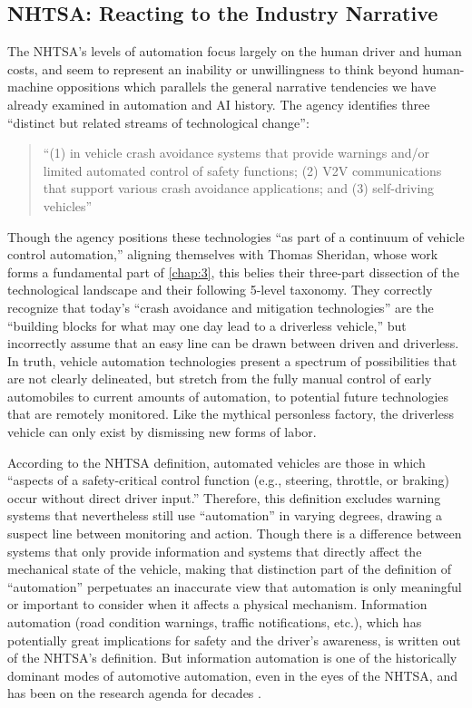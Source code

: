 \subsection{NHTSA: Reacting to the Industry Narrative}

The NHTSA's levels of automation focus largely on the human driver and
human costs, and seem to represent an inability or unwillingness to
think beyond human-machine oppositions which 
parallels the general narrative tendencies we have already examined in
automation and AI history. 
The agency identifies three ``distinct but related streams of
technological change'': 

\begin{quote}
``(1) in vehicle crash avoidance systems that provide warnings and/or
limited automated control of safety functions; (2) V2V communications
that support various crash avoidance applications; and (3)
self-driving vehicles''\cite[p. 3]{NHTSA}
\end{quote}

Though the agency positions these technologies ``as part of a
continuum of vehicle control automation,''\cite[p. 3]{NHTSA} aligning
themselves with Thomas Sheridan, whose
work forms a fundamental part of \ref{chap:3}, this belies
their three-part dissection of the technological landscape and their
following 5-level taxonomy. They correctly recognize that today's
``crash avoidance and mitigation technologies'' are the ``building blocks
for what may one day lead to a driverless vehicle,'' but incorrectly
assume that an easy line can be drawn between driven and
driverless.\cite[p. 3]{NHTSA} In truth, vehicle automation
technologies present a spectrum of possibilities that are not clearly
delineated, but stretch from the fully manual control of early
automobiles to current amounts of automation, to potential future
technologies that are remotely monitored. Like the mythical personless
factory, the driverless vehicle can only exist by dismissing new forms
of labor. 

According to the NHTSA definition, automated
vehicles are those in which ``aspects of a safety-critical control
function (e.g., steering, throttle, or braking) occur without direct
driver input.''\cite[p. 3]{NHTSA} Therefore, this definition excludes warning
systems that nevertheless still use ``automation'' in varying degrees,
drawing a suspect line between monitoring and action. Though there is
a difference between systems that only provide information and systems
that directly affect the mechanical state of the vehicle, making that
distinction part of the definition of ``automation'' perpetuates an
inaccurate view that automation is only meaningful or important to
consider when it affects a physical mechanism. Information automation
(road condition warnings, traffic notifications, etc.), which has
potentially great implications for safety and the driver's awareness,
is written out of the NHTSA's definition. But information automation
is one of the historically dominant modes of automotive automation,
even in the eyes of the NHTSA, and has been on the research agenda for
decades \cite[p. 11]{wetmore}.


